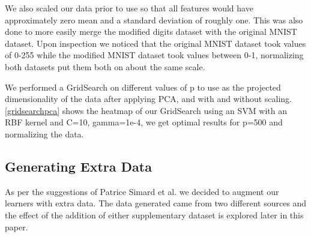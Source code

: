 \documentclass[conference]{IEEEtran}
\begin{document}
We also scaled our data prior to use so that all features would have approximately zero mean and a standard deviation of roughly one. This was also done to more easily merge the modified digits dataset with the original MNIST dataset. Upon inspection we noticed that the original MNIST dataset took values of 0-255 while the modified MNIST dataset took values between 0-1, normalizing both datasets put them both on about the same scale. 

We performed a GridSearch on different values of p to use as the projected dimensionality of the data after applying PCA, and with and without scaling. \ref{gridsearchpca} shows the heatmap of our GridSearch using an SVM with an RBF kernel and C=10, gamma=1e-4, we get optimal results for p=500 and normalizing the data. 

\subsection{Generating Extra Data}

As per the suggestions of Patrice Simard et al. \cite{Simard} we decided to augment our learners with extra data. The data generated came from two different sources and the effect of the addition of either supplementary dataset is explored later in this paper.
\end{document}
